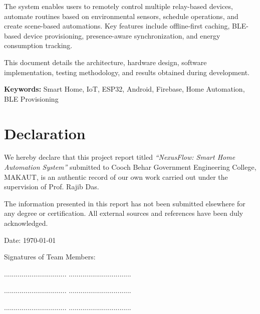 \documentclass[12pt,a4paper,oneside]{report}
\begin{document}
The system enables users to remotely control multiple relay-based devices, automate routines based on environmental sensors, schedule operations, and create scene-based automations. Key features include offline-first caching, BLE-based device provisioning, presence-aware synchronization, and energy consumption tracking.

This document details the architecture, hardware design, software implementation, testing methodology, and results obtained during development.

\vspace{1cm}

\textbf{Keywords:} Smart Home, IoT, ESP32, Android, Firebase, Home Automation, BLE Provisioning

\chapter*{Declaration}

We hereby declare that this project report titled \textit{``NexusFlow: Smart Home Automation System''} submitted to Cooch Behar Government Engineering College, MAKAUT, is an authentic record of our own work carried out under the supervision of Prof. Rajib Das.

The information presented in this report has not been submitted elsewhere for any degree or certification. All external sources and references have been duly acknowledged.

\vspace{2cm}

Date: \today

\vspace{0.5cm}

Signatures of Team Members:

\vspace{0.5cm}

\hspace{1cm} ................................ \hspace{2cm} ................................

\hspace{1cm} ................................ \hspace{2cm} ................................

\hspace{1cm} ................................ \hspace{2cm} ................................
\end{document}
